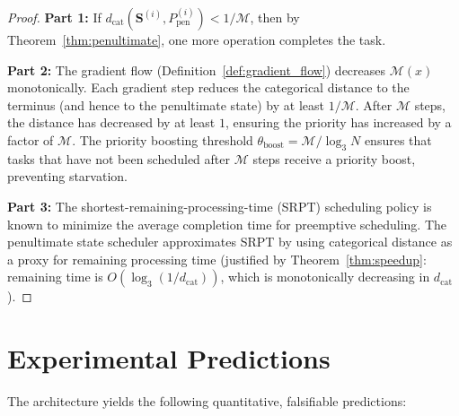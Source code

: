 \documentclass[twocolumn,10pt]{article}
\theoremstyle{remark}
\newcommand{\Depth}{\mathcal{M}}
\newcommand{\Scoord}{\mathbf{S}}
\begin{document}
\begin{proof}
\textbf{Part 1:} If $d_{\mathrm{cat}}(\Scoord^{(i)}, P_{\mathrm{pen}}^{(i)}) < 1/\Depth$, then by Theorem~\ref{thm:penultimate}, one more operation completes the task.

\textbf{Part 2:} The gradient flow (Definition~\ref{def:gradient_flow}) decreases $\Depth(x)$ monotonically. Each gradient step reduces the categorical distance to the terminus (and hence to the penultimate state) by at least $1/\Depth$. After $\Depth$ steps, the distance has decreased by at least $1$, ensuring the priority has increased by a factor of $\Depth$. The priority boosting threshold $\theta_{\mathrm{boost}} = \Depth / \log_3 N$ ensures that tasks that have not been scheduled after $\Depth$ steps receive a priority boost, preventing starvation.

\textbf{Part 3:} The shortest-remaining-processing-time (SRPT) scheduling policy is known to minimize the average completion time for preemptive scheduling. The penultimate state scheduler approximates SRPT by using categorical distance as a proxy for remaining processing time (justified by Theorem~\ref{thm:speedup}: remaining time is $O(\log_3(1/d_{\mathrm{cat}}))$, which is monotonically decreasing in $d_{\mathrm{cat}}$).
\end{proof}

\section{Experimental Predictions}
\label{sec:predictions}

The architecture yields the following quantitative, falsifiable predictions:
\end{document}
